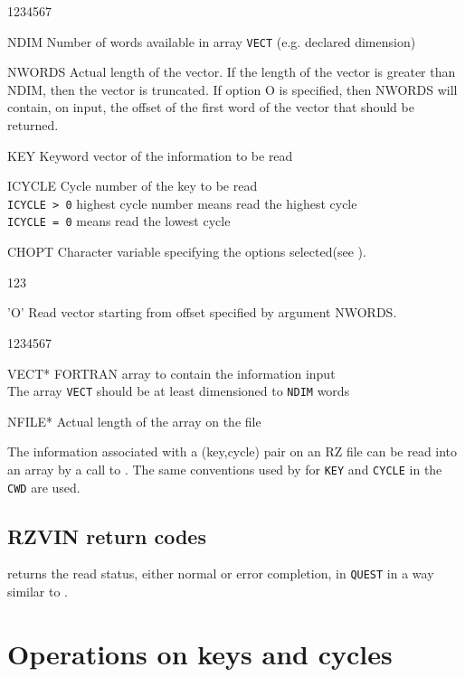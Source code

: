 \Idesc
\begin{DLtt}{1234567}
\item[NDIM]Number of words available in array {\tt VECT} (e.g. declared
dimension)
\item[NWORDS]Actual length of the vector. If the length of the vector
is greater than NDIM, then the vector is truncated. If option O
is specified, then NWORDS will contain, on input, the offset of the 
first word of the vector that should be returned.
\item[KEY]Keyword vector of the information to be read
\item[ICYCLE]Cycle number of the key to be read\\
{\tt ICYCLE > 0} highest cycle number means read the highest cycle\\
{\tt ICYCLE = 0} means read the lowest cycle
\item[CHOPT]Character variable specifying the options selected(see ).
\begin{DLtt}{123}
\item['O']Read vector starting from offset specified by argument NWORDS.
\end{DLtt}
\end{DLtt}
\Odesc
\begin{DLtt}{1234567}
\item[VECT*]FORTRAN array to contain the information input\\
The array {\tt VECT} should be at least dimensioned to {\tt NDIM} words
\item[NFILE*]Actual length of the array on the file
\end{DLtt}

The information associated with a (key,cycle) pair on an RZ file can
be read into an array by a call to .
The same conventions used by  for {\tt KEY} and 
{\tt CYCLE} in the {\tt CWD} are used.

\subsection*{RZVIN return codes}

 returns the read status, either normal or error completion,
in {\tt QUEST} in a way similar to .

\section{Operations on keys and cycles}

